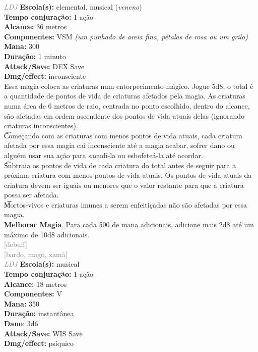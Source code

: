 \documentclass{RPG_Adventure}[2021/10/20]
\begin{document}
{\tiny \textcolor{gray}{\textit{LDJ}}}\jump{}
{\small \t \textbf{Escola(s):} elemental, musical (\textit{veneno})\\\t \textbf{Tempo conjuração:} 1 ação\\\t \textbf{Alcance:} 36 metros\\\t \textbf{Componentes:} VSM \textit{(um punhado de areia fina, pétalas de rosa ou um grilo)}\\\t \textbf{Mana:} 300\\\t \textbf{Duração:} 1 minuto\\\t \textbf{Attack/Save:} DEX Save\\\t \textbf{Dmg/effect:} inconsciente\\}
{\normalsize Essa magia coloca as criaturas num entorpecimento mágico. Jogue 5d8, o total é a quantidade de pontos de vida de criaturas afetados pela magia. As criaturas numa área de 6 metros de raio, centrada no ponto escolhido, dentro do alcance, são afetadas em ordem ascendente dos pontos de vida atuais delas (ignorando criaturas inconscientes).\\\t Começando com as criaturas com menos pontos de vida atuais, cada criatura afetada por essa magia cai inconsciente até a magia acabar, sofrer dano ou alguém usar sua ação para sacudi-la ou esbofeteá-la até acordar.\\\t Subtraia os pontos de vida de cada criatura do total antes de seguir para a próxima criatura com menos pontos de vida atuais. Os pontos de vida atuais da criatura devem ser iguais ou menores que o valor restante para que a criatura possa ser afetada.\\\t Mortos-vivos e criaturas imunes a serem enfeitiçadas não são afetadas por essa magia.\\\t \textbf{Melhorar Magia}. Para cada 500 de mana adicionais, adicione mais 2d8 até um máximo de 10d8 adicionais.\\}
{\scriptsize \textcolor{gray}{[debuff]\\}}
{\scriptsize \textcolor{gray}{[bardo, mago, xamã]\\}}
{\tiny \textcolor{gray}{\textit{LDJ}}}\jump{}
{\small \t \textbf{Escola(s):} musical\\\t \textbf{Tempo conjuração:} 1 ação\\\t \textbf{Alcance:} 18 metros\\\t \textbf{Componentes:} V\\\t \textbf{Mana:} 350\\\t \textbf{Duração:} instantânea\\\t \textbf{Dano}: 3d6\\\t \textbf{Attack/Save:} WIS Save\\\t \textbf{Dmg/effect:} psíquico\\}
\end{document}
